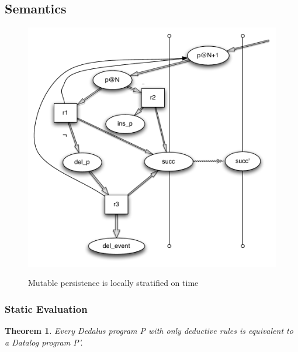 \subsection{Semantics}


\begin{figure}[t]
  \centering
  \includegraphics[width=0.75\linewidth]{localstrat_rgg.pdf}
  \label{fig:lstrat}
  \caption{Mutable persistence is locally stratified on time}
\vspace{-8pt}
\end{figure}


\subsubsection{Static Evaluation}
\newtheorem{theorem}{Theorem}

\begin{theorem}
Every Dedalus program P with only deductive rules is equivalent to a Datalog program P'.
\end{theorem}

